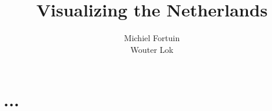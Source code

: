 \documentclass[11pt,a4paper]{report}
\title{Visualizing the Netherlands}
\subtitle{}
\author{Michiel Fortuin\\Wouter Lok}
\begin{document}
\maketitle

\tableofcontents

\chapter{...}

\end{document}
